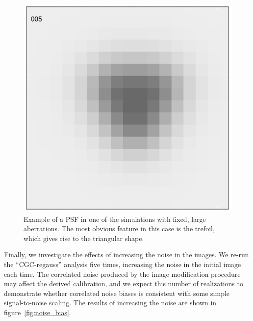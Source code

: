 \documentclass[iop]{emulateapj}
\begin{document}
\begin{figure}
\begin{center}
\includegraphics[width=0.8\columnwidth]{../Plots/rgc_fixedaber_psf_005.pdf}
\end{center}
\caption{Example of a PSF in one of the simulations with fixed, large aberrations.  The most obvious
feature in this case is the trefoil, which gives rise to the triangular shape. \label{fig:trefoil}}
\end{figure}

Finally, we investigate the effects of increasing the noise in the
images. We re-run the ``CGC-regauss'' analysis five times, increasing
the noise in the initial image each time. The correlated noise
produced by the image modification procedure may affect the derived
calibration, and we expect this number of realizations to demonstrate
whether correlated noise biases is consistent with some simple
signal-to-noise scaling. The results of increasing the noise are
shown in figure~\ref{fig:noise_bias}.
\end{document}
